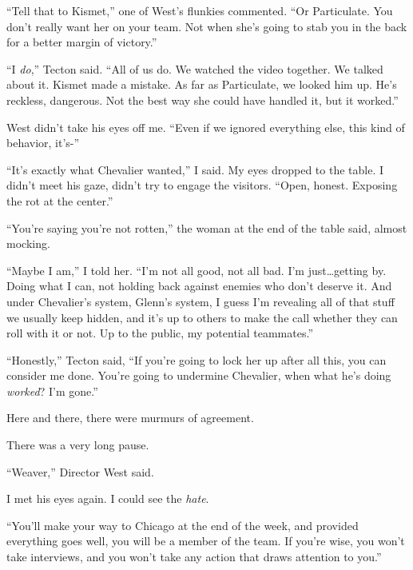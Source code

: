 ``Tell that to Kismet,'' one of West's flunkies commented.  ``Or Particulate.  You don't really want her on your team.  Not when she's going to stab you in the back for a better margin of victory.''



``I \emph{do},'' Tecton said.  ``All of us do.  We watched the video together.  We talked about it.  Kismet made a mistake.  As far as Particulate, we looked him up.  He's reckless, dangerous.  Not the best way she could have handled it, but it worked.''



West didn't take his eyes off me.  ``Even if we ignored everything else, this kind of behavior, it's-''



``It's exactly what Chevalier wanted,'' I said.  My eyes dropped to the table.  I didn't meet his gaze, didn't try to engage the visitors.  ``Open, honest.  Exposing the rot at the center.''



``You're saying you're not rotten,'' the woman at the end of the table said, almost mocking.



``Maybe I am,'' I told her.  ``I'm not all good, not all bad.  I'm just\ldots getting by.  Doing what I can, not holding back against enemies who don't deserve it.  And under Chevalier's system, Glenn's system, I guess I'm revealing all of that stuff we usually keep hidden, and it's up to others to make the call whether they can roll with it or not.  Up to the public, my potential teammates.''



``Honestly,'' Tecton said, ``If you're going to lock her up after all this, you can consider me done.  You're going to undermine Chevalier, when what he's doing \emph{worked}?  I'm gone.''



Here and there, there were murmurs of agreement.



There was a very long pause.



``Weaver,'' Director West said.



I met his eyes again.  I could see the \emph{hate}.



``You'll make your way to Chicago at the end of the week, and provided everything goes well, you will be a member of the team.  If you're wise, you won't take interviews, and you won't take any action that draws attention to you.''



